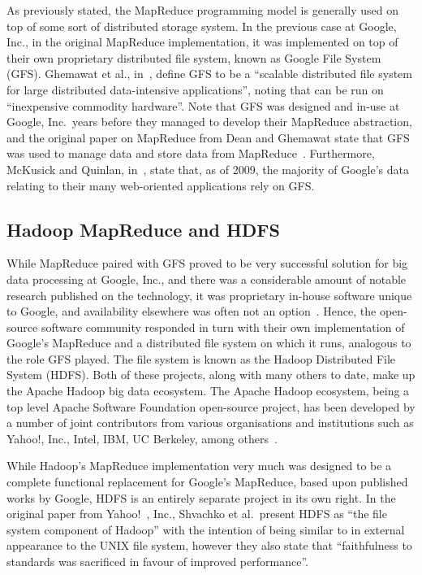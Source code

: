 As previously stated, the MapReduce programming model is generally used on top of some sort of distributed storage
system. In the previous case at Google, Inc., in the original MapReduce implementation, it was implemented on top of
their own proprietary distributed file system, known as Google File System (GFS). Ghemawat et al.,
in~\cite{ghemawat_google_2003}, define GFS to be a ``scalable distributed file system for large distributed data-intensive
applications'', noting that can be run on ``inexpensive commodity hardware''. Note that GFS was designed and in-use
at Google, Inc.\ years before they managed to develop their MapReduce abstraction, and the original paper on MapReduce
from Dean and Ghemawat state that GFS was used to manage data and store data from MapReduce~\cite{dean_mapreduce:_2008}.
Furthermore, McKusick and Quinlan, in~\cite{mckusick2009gfs}, state that, as of 2009, the majority of Google's data
relating to their many web-oriented applications rely on GFS.



\subsection{Hadoop MapReduce and HDFS} %
\label{ssub:hadoop_mapreduce_and_hdfs}

While MapReduce paired with GFS proved to be very successful solution for big data processing at Google, Inc., and
there was a considerable amount of notable research published on the technology, it was proprietary in-house software
unique to Google, and availability elsewhere was often not an option~\cite{grossman2009varieties}. Hence, the
open-source software community responded in turn with their own implementation of Google's MapReduce and a
distributed file system on which it runs,
analogous to the role GFS played. The file system is known as the Hadoop Distributed File System (HDFS). Both of these
projects, along with many others to date, make up the Apache Hadoop
big data ecosystem. The Apache Hadoop ecosystem, being a top level Apache Software
Foundation open-source project, has been developed by a number of joint contributors from various organisations and
institutions such as Yahoo!, Inc., Intel, IBM, UC Berkeley, among others~\cite{hadoop_committers}.

While Hadoop's MapReduce implementation very much was designed to be a complete functional replacement for Google's MapReduce, based upon published works by Google,
HDFS is an entirely separate project in its own right. In the original paper from Yahoo!~\cite{shvachko_hadoop_2010},
Inc., Shvachko et al.\ present HDFS as ``the file system component of Hadoop'' with the intention of being similar to
in external appearance to the UNIX file system, however they also state that ``faithfulness to standards was sacrificed
in favour of improved performance''.

